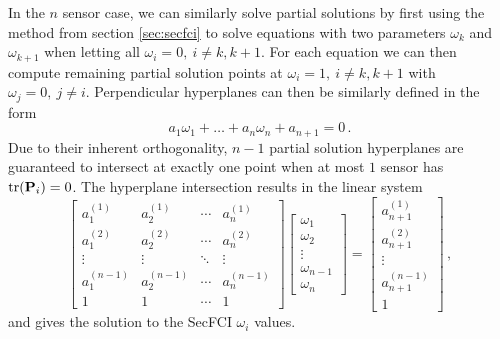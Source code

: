 \documentclass[letterpaper, 10 pt, conference]{ieeeconf}  %
\begin{document}
In the $n$ sensor case, we can similarly solve partial solutions by first using the method from section \ref{sec:secfci} to solve equations with two parameters $\omega_k$ and $\omega_{k+1}$ when letting all $\omega_i=0,\ i\neq k,k+1$. For each equation we can then compute remaining partial solution points at $\omega_i=1,\ i\neq k,k+1$ with $\omega_j=0,\ j\neq i$. Perpendicular hyperplanes can then be similarly defined in the form 
\begin{equation}
   a_1\omega_1 + \dots +a_n\omega_n + a_{n+1} = 0\,. \label{eqn:nsen_plane_eq}
\end{equation}
Due to their inherent orthogonality, $n-1$ partial solution hyperplanes are guaranteed to intersect at exactly one point when at most $1$ sensor has $\operatorname{tr}({{\mathbf{P}}}_i)=0$. The hyperplane intersection results in the linear system 
\begin{equation}
   \begin{bmatrix}
      a_1^{(1)} & a_2^{(1)} & \cdots & a_{n}^{(1)} \\
      a_1^{(2)} & a_2^{(2)} & \cdots & a_{n}^{(2)} \\
      \vdots & \vdots & \ddots & \vdots \\
      a_1^{(n-1)} & a_2^{(n-1)} & \cdots & a_{n}^{(n-1)} \\
      1 & 1 & \cdots & 1
   \end{bmatrix}
   \begin{bmatrix}
      \omega_1 \\
      \omega_2 \\
      \vdots \\
      \omega_{n-1} \\
      \omega_{n}
   \end{bmatrix}
   =
   \begin{bmatrix}
      a_{n+1}^{(1)} \\
      a_{n+1}^{(2)} \\
      \vdots \\
      a_{n+1}^{(n-1)} \\
      1
   \end{bmatrix}\,, \label{eqn:hyperplane_sol_eq}
\end{equation}
and gives the solution to the SecFCI $\omega_i$ values.
\end{document}
